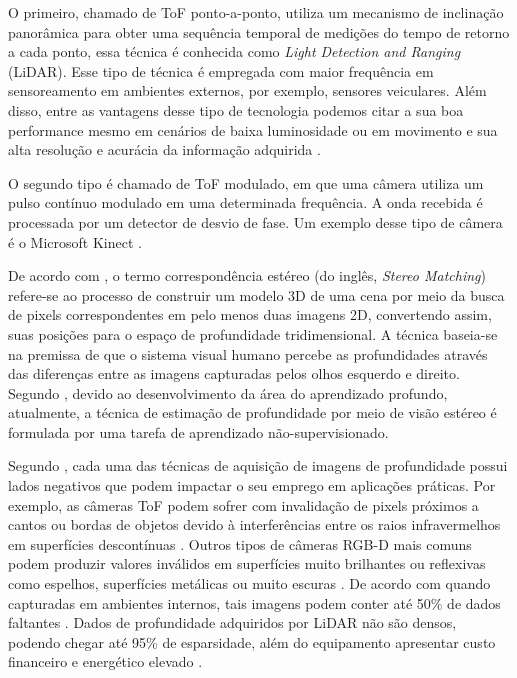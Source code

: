  O primeiro, chamado de ToF ponto-a-ponto, utiliza um mecanismo de inclinação panorâmica para obter uma sequência temporal de medições do tempo de retorno a cada ponto, essa técnica é conhecida como \textit{Light Detection and Ranging} (LiDAR). Esse tipo de técnica é empregada com maior frequência em sensoreamento em ambientes externos, por exemplo, sensores veiculares. Além disso, entre as vantagens desse tipo de tecnologia podemos citar a sua boa performance mesmo em cenários de baixa luminosidade ou em movimento e sua alta resolução e acurácia da informação adquirida \cite{zollhofer2019commodity}.


O segundo tipo é chamado de ToF modulado, em que uma câmera utiliza um pulso contínuo modulado em uma determinada frequência. A onda recebida é processada por um detector de desvio de fase. Um exemplo desse tipo de câmera é o Microsoft Kinect \cite{zollhofer2019commodity}.

De acordo com , o termo correspondência estéreo (do inglês, \textit{Stereo Matching}) refere-se ao processo de construir um modelo 3D de uma cena por meio da busca de pixels correspondentes em pelo menos duas imagens 2D, convertendo assim, suas posições para o espaço de profundidade tridimensional. A técnica baseia-se na premissa de que o sistema visual humano percebe as profundidades através das diferenças entre as imagens capturadas pelos olhos esquerdo e direito. Segundo , devido ao desenvolvimento da área do aprendizado profundo, atualmente, a técnica de estimação de profundidade por meio de visão estéreo é formulada por uma tarefa de aprendizado não-supervisionado.



Segundo \cite{castellano2023performance}, cada uma das técnicas de aquisição de imagens de profundidade possui lados negativos que podem impactar o seu emprego em aplicações práticas. Por exemplo, as câmeras ToF podem sofrer com invalidação de pixels próximos a cantos ou bordas de objetos devido à interferências entre os raios infravermelhos em superfícies descontínuas \cite{hansard2012time}. Outros tipos de câmeras RGB-D mais comuns podem produzir valores inválidos em superfícies muito brilhantes ou reflexivas como espelhos, superfícies metálicas ou muito escuras \cite{zollhofer2019commodity}. De acordo com  quando capturadas em ambientes internos, tais imagens podem conter até 50\% de dados faltantes \cite{zhang2018deep}. Dados de profundidade adquiridos por LiDAR não são densos, podendo chegar até 95\% de esparsidade, além do equipamento apresentar custo financeiro e energético elevado \cite{khan2020deep} \cite{hu2022deep}.


